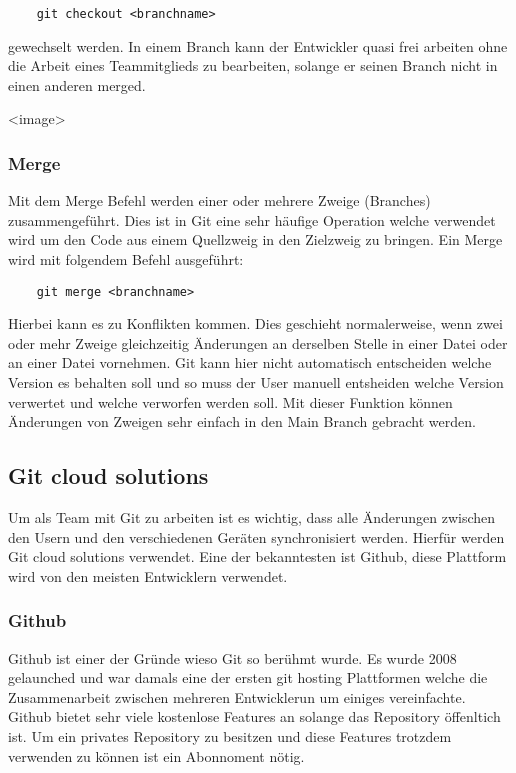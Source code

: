 \begin{verbatim}
    git checkout <branchname>
\end{verbatim}

gewechselt werden.
In einem Branch kann der Entwickler quasi frei arbeiten ohne die Arbeit eines Teammitglieds zu bearbeiten, solange er seinen Branch nicht in einen anderen merged.

<image>

\cite{Github_Branches}

\subsubsection{Merge}

Mit dem Merge Befehl werden einer oder mehrere Zweige (Branches) zusammengeführt. Dies ist in Git eine sehr häufige Operation welche verwendet wird um den Code aus einem Quellzweig in den Zielzweig zu bringen.
Ein Merge wird mit folgendem Befehl ausgeführt: 

\begin{verbatim}
    git merge <branchname>
\end{verbatim}

Hierbei kann es zu Konflikten kommen. Dies geschieht normalerweise, wenn zwei oder mehr Zweige gleichzeitig Änderungen an derselben Stelle in einer Datei oder an einer Datei vornehmen. Git kann hier nicht automatisch entscheiden welche Version es behalten soll und so muss der User manuell entsheiden welche Version verwertet und welche verworfen werden soll. Mit dieser Funktion können Änderungen von Zweigen sehr einfach in den Main Branch gebracht werden.

\subsection{Git cloud solutions}

Um als Team mit Git zu arbeiten ist es wichtig, dass alle Änderungen zwischen den Usern und den verschiedenen Geräten synchronisiert werden. Hierfür werden Git cloud solutions verwendet. Eine der bekanntesten ist Github, diese Plattform wird von den meisten Entwicklern verwendet.

\subsubsection{Github}

Github ist einer der Gründe wieso Git so berühmt wurde. Es wurde 2008 gelaunched und war damals eine der ersten git hosting Plattformen welche die Zusammenarbeit zwischen mehreren Entwicklerun um einiges vereinfachte. Github bietet sehr viele kostenlose Features an solange das Repository öffenltich ist. Um ein privates Repository zu besitzen und diese Features trotzdem verwenden zu können ist ein Abonnoment nötig.

\cite{Github_1}
\cite{Github_2}